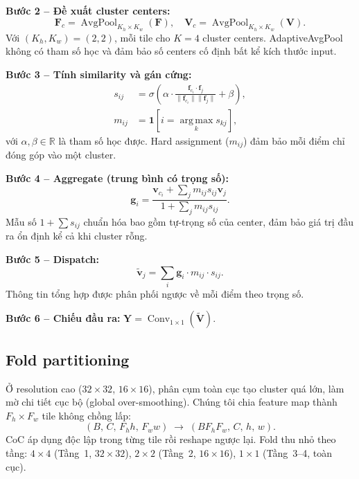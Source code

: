 \documentclass[journal]{IEEEtran}
\begin{document}
\noindent\textbf{Bước 2 -- Đề xuất cluster centers:}
\begin{equation}
  \mathbf{F}_c = \operatorname{AvgPool}_{K_h\times K_w}(\mathbf{F}),\quad
  \mathbf{V}_c = \operatorname{AvgPool}_{K_h\times K_w}(\mathbf{V}).
  \label{eq:centers}
\end{equation}
Với $(K_h,K_w){=}(2,2)$, mỗi tile cho $K{=}4$ cluster centers.
AdaptiveAvgPool không có tham số học và đảm bảo số centers cố định
bất kể kích thước input.

\noindent\textbf{Bước 3 -- Tính similarity và gán cứng:}
\begin{align}
  s_{ij} &= \sigma\!\left(\alpha\cdot
    \frac{\mathbf{f}_{c_i}\cdot\mathbf{f}_j}
         {\|\mathbf{f}_{c_i}\|\|\mathbf{f}_j\|}+\beta\right),
  \label{eq:sim}\\
  m_{ij} &= \mathbf{1}\!\left[i=\operatorname*{arg\,max}_{k}s_{kj}\right],
  \label{eq:mask}
\end{align}
với $\alpha,\beta\in\mathbb{R}$ là tham số học được. Hard assignment
($m_{ij}$) đảm bảo mỗi điểm chỉ đóng góp vào một cluster.

\noindent\textbf{Bước 4 -- Aggregate (trung bình có trọng số):}
\begin{equation}
  \mathbf{g}_i =
  \frac{\mathbf{v}_{c_i}+\displaystyle\sum_j m_{ij}s_{ij}\mathbf{v}_j}
       {1+\displaystyle\sum_j m_{ij}s_{ij}}.
  \label{eq:aggregate}
\end{equation}
Mẫu số $1{+}\sum s_{ij}$ chuẩn hóa bao gồm tự-trọng số của center,
đảm bảo giá trị đầu ra ổn định kể cả khi cluster rỗng.

\noindent\textbf{Bước 5 -- Dispatch:}
\begin{equation}
  \tilde{\mathbf{v}}_j = \sum_i\mathbf{g}_i\cdot m_{ij}\cdot s_{ij}.
  \label{eq:dispatch}
\end{equation}
Thông tin tổng hợp được phân phối ngược về mỗi điểm theo trọng số.

\noindent\textbf{Bước 6 -- Chiếu đầu ra:}
$\mathbf{Y}=\operatorname{Conv}_{1\times1}(\tilde{\mathbf{V}})$.

\subsection{Fold partitioning}

Ở resolution cao ($32\!\times\!32$, $16\!\times\!16$), phân cụm toàn
cục tạo cluster quá lớn, làm mờ chi tiết cục bộ (global
over-smoothing). Chúng tôi chia feature map thành
$F_h\!\times\!F_w$ tile không chồng lấp:
\begin{equation}
  (B,\,C,\,F_h h,\,F_w w)\;\longrightarrow\;(B F_h F_w,\,C,\,h,\,w).
  \label{eq:fold}
\end{equation}
CoC áp dụng độc lập trong từng tile rồi reshape ngược lại. Fold thu
nhỏ theo tầng: $4\!\times\!4$ (Tầng~1, $32\!\times\!32$),
$2\!\times\!2$ (Tầng~2, $16\!\times\!16$), $1\!\times\!1$
(Tầng~3--4, toàn cục).
\end{document}
